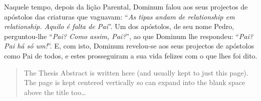 \documentclass[11pt, twoside]{Thesis} %
\begin{document}
\frontmatter %



\maketitle


{
	Naquele tempo, depois da lição Parental, Dominum falou aos seus projectos de apóstolos das criaturas que vaguavam: ``\emph{As tipas andam de relationship em relationship. Aquilo é falta de Pai}''. Um dos apóstolos, de seu nome Pedro, perguntou-lhe ``\emph{Pai? Como assim, Pai?}'', ao que Dominum lhe respondeu: ``\emph{Pai? Pai há só um!}''. E, com isto, Dominum revelou-se aos seus projectos de apóstolos como Pai de todos, e estes prosseguiram a sua vida felizes com o que lhes foi dito.
}



\begin{acknowledgements}
	\lipsum[1]
\end{acknowledgements}

\addvspacetoc{0.3cm} %



\begin{abstract}

	The Thesis Abstract is written here (and usually kept to just this page). The page is kept centered vertically so can expand into the blank space above the title too\ldots
	
\end{abstract}


\end{document}
